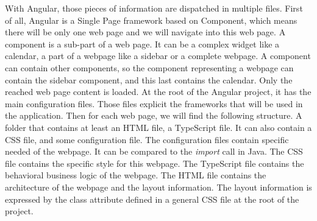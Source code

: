 \documentclass[conference]{IEEEtran}
\begin{document}
    \begin{table}[hbtp]
    \caption{Comparison of GWT architecture and Angular one}
    \label{tab:gwtArchitectureToAngular}
    \begin {center}
    \end{center}
    \end{table}
    
    
    With Angular, those pieces of information are dispatched in multiple files.
    First of all, Angular is a Single Page framework based on Component,
        which means there will be only one web page 
        and we will navigate into this web page.
    A component is a sub-part of a web page.
    It can be a complex widget like a calendar,
        a part of a webpage like a sidebar
        or a complete webpage.
    A component can contain other components, 
        so the component representing a webpage can contain the sidebar component,
        and this last contains the calendar.
    Only the reached web page content is loaded.
    At the root of the Angular project,
        it has the main configuration files.
    Those files explicit the frameworks that will be used in the application.
    Then for each web page, we will find the following structure.
    A folder that contains at least an HTML file, a TypeScript file.
    It can also contain a CSS file, and some configuration file.
    The configuration files contain specific needed of the webpage.
    It can be compared to the \textit{import} call in Java.
    The CSS file contains the specific style for this webpage.
    The TypeScript file contains the behavioral business logic of the webpage. 
    The HTML file contains the architecture of the webpage and the layout information.
    The layout information is expressed by the class attribute defined in a general CSS file 
        at the root of the project. 
    
\end{document}
